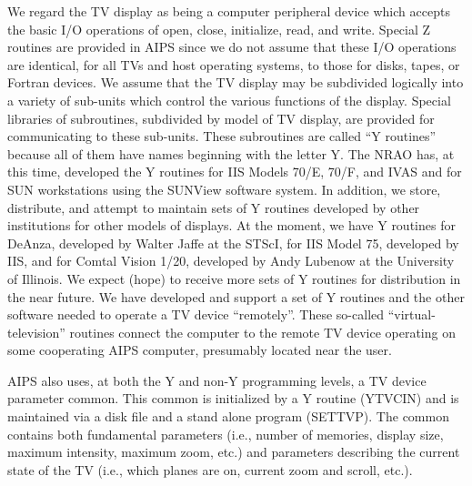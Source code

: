 We regard the TV display as being a computer peripheral device which
accepts the basic I/O operations of open, close, initialize, read, and
write.  Special Z routines are provided in AIPS since we do not assume
that these I/O operations are identical, for all TVs and host
operating systems, to those for disks, tapes, or Fortran devices.  We
assume that the TV display may be subdivided logically into a variety
of sub-units which control the various functions of the display.
Special libraries of subroutines, subdivided by model of TV display,
are provided for communicating to these sub-units. These subroutines
are called ``Y routines'' because all of them have
names beginning with the letter Y.  The NRAO has, at this time,
developed the Y routines for IIS Models 70/E, 70/F, and IVAS and for
SUN workstations using the SUNView software system.  In addition, we
store, distribute, and attempt to maintain sets of Y routines
developed by other institutions for other models of displays.  At the
moment, we have Y routines for DeAnza, developed by Walter Jaffe at
the STScI, for IIS Model 75, developed by IIS, and for Comtal Vision
1/20, developed by Andy Lubenow at the University of Illinois.  We
expect (hope) to receive more sets of Y routines for distribution in
the near future.  We have developed and support a set of Y routines
and the other software needed to operate a TV device ``remotely''.
These so-called ``virtual-television'' routines connect the computer
to the remote TV device operating on some cooperating AIPS computer,
presumably located near the user.

AIPS also uses, at both the Y and non-Y programming levels, a TV
device parameter common.  This common is initialized by a Y routine
(YTVCIN) and is maintained via a disk file and a stand alone program
(SETTVP).  The common contains both fundamental parameters (i.e.,
number of memories, display size, maximum intensity, maximum zoom,
etc.) and parameters describing the current state of the TV (i.e.,
which planes are on, current zoom and scroll, etc.).


